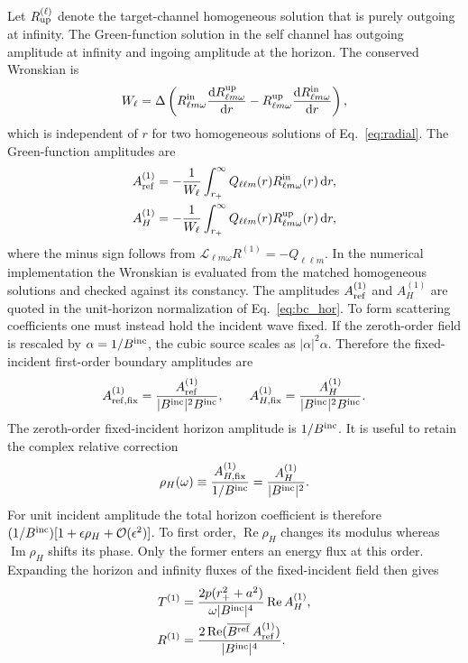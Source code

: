 \documentclass[aps,prd,twocolumn,10pt,nofootinbib,superscriptaddress,floatfix]{revtex4-2}
\newcommand{\dd}{\mathrm{d}}
\newcommand{\calO}{\mathcal{O}}
\newcommand{\rp}{r_+}
\newcommand{\Bin}{B^{\rm inc}}
\newcommand{\Bref}{B^{\rm ref}}
\newcommand{\Aref}{A_{\rm ref}^{(1)}}
\newcommand{\AH}{A_H^{(1)}}
\newcommand{\DeltaK}{\Delta}
\begin{document}
Let $R_{\rm up}^{(\ell)}$ denote the target-channel homogeneous solution that
is purely outgoing at infinity.  The Green-function solution in the self
channel has outgoing amplitude at infinity and ingoing amplitude at the
horizon.  The conserved Wronskian is
\begin{equation}
W_\ell=\DeltaK\left(
R^{\rm in}_{\ell m\omega}\frac{\dd R^{\rm up}_{\ell m\omega}}{\dd r}
-R^{\rm up}_{\ell m\omega}\frac{\dd R^{\rm in}_{\ell m\omega}}{\dd r}
\right),
\label{eq:wronskian}
\end{equation}
which is independent of $r$ for two homogeneous solutions of
Eq.~\eqref{eq:radial}.  The Green-function amplitudes are
\begin{align}
\Aref&=-\frac{1}{W_\ell}\int_{\rp}^{\infty}
Q_{\ell\ell m}(r)R^{\rm in}_{\ell m\omega}(r)\,\dd r,\\
\AH&=-\frac{1}{W_\ell}\int_{\rp}^{\infty}
Q_{\ell\ell m}(r)R^{\rm up}_{\ell m\omega}(r)\,\dd r ,
\end{align}
where the minus sign follows from
$\mathcal L_{\ell m\omega}R^{(1)}=-Q_{\ell\ell m}$.  In the numerical
implementation the Wronskian is evaluated from the matched homogeneous
solutions and checked against its constancy.  The amplitudes
$\Aref$ and $\AH$ are quoted in the unit-horizon normalization of
Eq.~\eqref{eq:bc_hor}.  To form scattering coefficients one must instead hold
the incident wave fixed.  If the zeroth-order field is rescaled by
$\alpha=1/\Bin$, the cubic source scales as $|\alpha|^2\alpha$.  Therefore the
fixed-incident first-order boundary amplitudes are
\begin{equation}
A_{{\rm ref},{\rm fix}}^{(1)}=\frac{\Aref}{|\Bin|^2\Bin},\qquad
A_{H,{\rm fix}}^{(1)}=\frac{\AH}{|\Bin|^2\Bin}.
\label{eq:fixed_incident_amplitudes}
\end{equation}
The zeroth-order fixed-incident horizon amplitude is $1/\Bin$.  It is useful
to retain the complex relative correction
\begin{equation}
 \rho_H(\omega)
 \equiv\frac{A_{H,{\rm fix}}^{(1)}}{1/\Bin}
 =\frac{\AH}{|\Bin|^2}.
 \label{eq:complex_horizon_response}
\end{equation}
For unit incident amplitude the total horizon coefficient is therefore
$(1/\Bin)[1+\epsilon\rho_H+\calO(\epsilon^2)]$.  To first order,
$\operatorname{Re}\rho_H$ changes its modulus whereas
$\operatorname{Im}\rho_H$ shifts its phase.  Only the former enters an
energy flux at this order.
Expanding the horizon and infinity fluxes of the fixed-incident field then
gives
\begin{align}
T^{(1)}
&=
\frac{2p(\rp^2+a^2)}{\omega|\Bin|^4}
\operatorname{Re}\AH ,
\label{eq:T1}\\
R^{(1)}
&=
\frac{2\operatorname{Re}(\overline{\Bref}\,\Aref)}{|\Bin|^4}.
\label{eq:R1}
\end{align}
\end{document}
